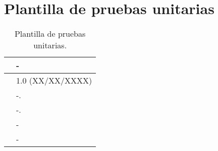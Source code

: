 \section{Plantilla de pruebas unitarias}

\begin{table}[H]
\begin{center}
\begin{tabular}{|p{3cm}|p{10cm}|} \hline
\centering {\bf PU-XX} & -  \\ \hline\hline
\centering {\bf Versión} & 1.0 (XX/XX/XXXX) \\ \hline
\centering {\bf Dependencias} &  -. \\ \hline
\centering {\bf Descripción} &  -. \\ \hline
\centering {\bf Criterio de aceptación} & - \\ \hline
\centering {\bf Estado} & - \\ \hline
\end{tabular}
\caption{Plantilla de pruebas unitarias.}
\label{enlacePUX}
\end{center}
\end{table}